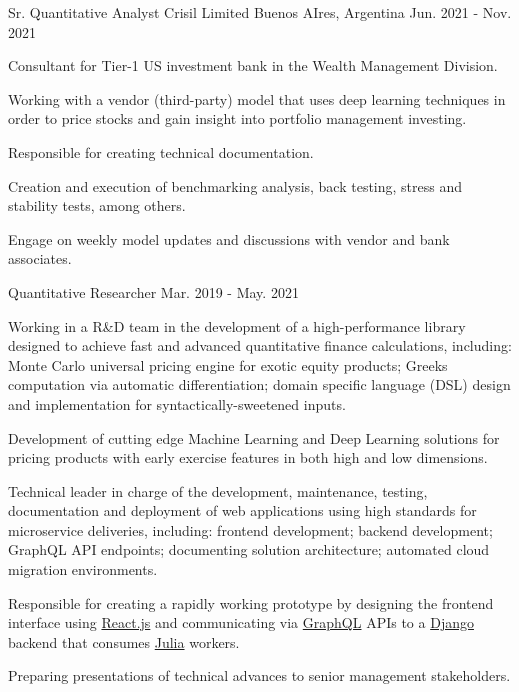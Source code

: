 \begin{cventries}
  \cventry
    {Sr. Quantitative Analyst} %
    {Crisil Limited} %
    {Buenos AIres, Argentina}  %
    {Jun. 2021 - Nov. 2021} %
    {
      \begin{cvitems} %
        \item {Consultant for Tier-1 US investment bank in the Wealth Management Division.}
        \item {Working with a vendor (third-party) model that uses deep learning techniques in order to price stocks and gain insight into portfolio management investing.}
        \item {Responsible for creating technical documentation.}
        \item {Creation and execution of benchmarking analysis, back testing, stress and stability tests, among others.}
        \item {Engage on weekly model updates and discussions with vendor and bank associates.}
      \end{cvitems}
    }

  \cventry
    {Quantitative Researcher} %
    {} %
    {} %
    {Mar. 2019 - May. 2021} %
    {
      \begin{cvitems} %
          \item{Working in a R\&D team in the development of a high-performance library designed to achieve fast and advanced quantitative finance calculations, including: Monte Carlo universal pricing engine for exotic equity products; Greeks computation via automatic differentiation; domain specific language (DSL) design and implementation for syntactically-sweetened inputs.}
          \item{Development of cutting edge Machine Learning and Deep Learning solutions for pricing products with early exercise features in both high and low dimensions.}
          \item {Technical leader in charge of the development, maintenance, testing, documentation and deployment of web applications using high standards for microservice deliveries, including: frontend development; backend development; GraphQL API endpoints; documenting solution architecture; automated cloud migration environments.}
          \item{Responsible for creating a rapidly working prototype by designing the frontend interface using \href{https://reactjs.org/}{React.js} and communicating via \href{https://graphql.org/}{GraphQL} APIs to a \href{https://www.djangoproject.com/}{Django} backend that consumes \href{https://julialang.org/}{Julia} workers.}
          \item{Preparing presentations of technical advances to senior management stakeholders.}
      \end{cvitems}
    }


\end{cventries}
